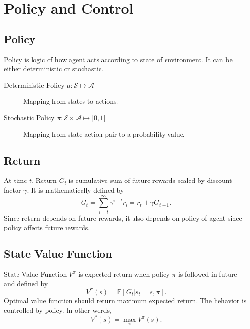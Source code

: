 \section{Policy and Control}
\label{sec:policy_control}

\subsection{Policy}

Policy is logic of how agent acts according to state of environment. 
It can be either deterministic or stochastic. 

\begin{description}
	\item[Deterministic Policy $\mu \colon \mathcal{S} \mapsto \mathcal{A}$] 
	Mapping from states to actions.
	\item[Stochastic Policy $\pi \colon \mathcal{S} \times \mathcal{A} \mapsto \lbrack 0,1 \rbrack$] 
	Mapping from state-action pair to a probability value.
\end{description}

\subsection{Return}

At time $t$, Return $G_t$ is cumulative sum of future rewards scaled by discount factor $\gamma$. 
It is mathematically defined by 
\begin{equation}
\label{eqn:return_dfn}
G_t = \sum_{i=t}^{\infty} \gamma^{i-t} r_i = r_t + \gamma G_{t+1}.
\end{equation}
Since return depends on future rewards, it also depends on policy of agent since policy affects future rewards.

\subsection{State Value Function}

State Value Function $V^{\pi}$ is expected return when policy $\pi$ is followed in future and defined by
\begin{equation}
V^{\pi}(s) = \mathbb{E}[G_t|s_t=s, \pi]. %
\end{equation}
Optimal value function should return maximum expected return. 
The behavior is controlled by policy. In other words, 
\begin{equation}
V^{*}(s) = \max_{\pi} V^{\pi}(s).
\end{equation}


